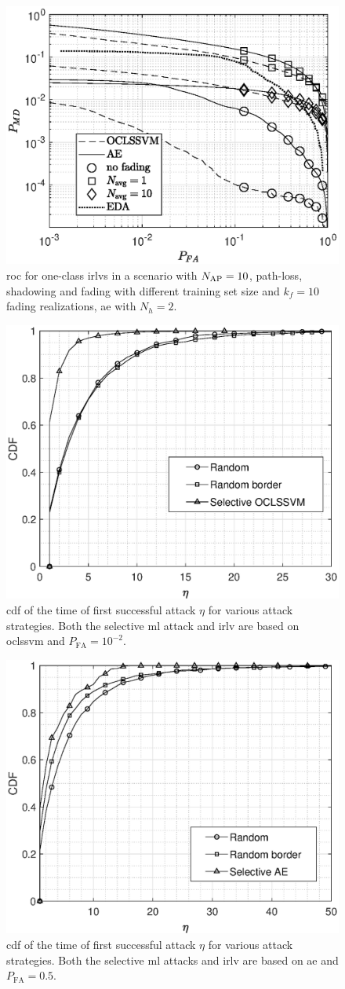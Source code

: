 \documentclass[draftcls,onecolumn,12pt]{IEEEtran}
\begin{document}
\begin{figure}[t]
    \centering
    \includegraphics[width=0.6\columnwidth]{res_Fading_10BS_oneClass.eps}
    \caption{\ac{roc} for one-class \acp{irlv} in a scenario with $N_{\rm AP}=10$, path-loss, shadowing and fading with different training set size and $k_f=10$ fading realizations,  \ac{ae} with $N_h = 2$. }
    \label{fig:kf10Oc}
\end{figure}




\begin{figure}[t]
    \centering
    \includegraphics[width=0.6\columnwidth]{res_selective_SVM.eps}
    \caption{\ac{cdf} of the time of first successful attack $\eta$ for various attack strategies. Both the selective \ac{ml} attack  and \ac{irlv} are based on \ac{oclssvm} and $P_{\text{FA}}= 10^{-2}$.}
    \label{fig:selectiveSVM}
\end{figure}

\begin{figure}[t]
    \centering
    \includegraphics[width=0.6\columnwidth]{res_selective_AE.eps}
    \caption{\ac{cdf} of the time of first successful attack $\eta$ for various attack strategies. Both the selective \ac{ml} attacks  and \ac{irlv} are based on \ac{ae} and $P_{\text{FA}}= 0.5$.}
    \label{fig:selectiveAE}
\end{figure}
\end{document}
